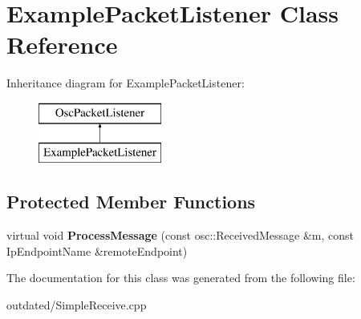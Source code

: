 \hypertarget{classExamplePacketListener}{}\section{Example\+Packet\+Listener Class Reference}
\label{classExamplePacketListener}
Inheritance diagram for Example\+Packet\+Listener\+:\begin{figure}[H]
\begin{center}
\leavevmode
\includegraphics[height=2.000000cm]{classExamplePacketListener}
\end{center}
\end{figure}
\subsection*{Protected Member Functions}
\begin{DoxyCompactItemize}
\item 
virtual void {\bfseries Process\+Message} (const osc\+::\+Received\+Message \&m, const Ip\+Endpoint\+Name \&remote\+Endpoint)\hypertarget{classExamplePacketListener_a688ed2a3ec01d0fb7661f4fe0ffc90df}{}\label{classExamplePacketListener_a688ed2a3ec01d0fb7661f4fe0ffc90df}

\end{DoxyCompactItemize}


The documentation for this class was generated from the following file\+:\begin{DoxyCompactItemize}
\item 
outdated/Simple\+Receive.\+cpp\end{DoxyCompactItemize}
